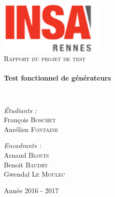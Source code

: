 \begin{titlepage}
		\begin{sffamily}
			\begin{center}

				\includegraphics[width=150pt]{images/logo_INSA.png}~\\[2.5cm]

				\textsc{\huge Rapport du projet de test}\\[2.5cm]

				\HRule \\[0.4cm]
				{ \huge \bfseries Test fonctionnel de générateurs\\[0.4cm] }

				\HRule \\[4cm]

				\begin{minipage}{0.4\textwidth}
					\begin{flushleft} \large
						\emph{Étudiants :}\\
						François \textsc{Boschet}\\
						Aurélien \textsc{Fontaine}
					\end{flushleft}
				\end{minipage}
				\begin{minipage}{0.5\textwidth}
					\begin{flushright} \large
						\emph{Encadrants :} \\
						Arnaud \textsc{Blouin}\\
                        Benoit \textsc{Baudry}\\
                        Gwendal \textsc{Le Moulec}\\
					\end{flushright}
				\end{minipage}

				\vfill

				{\large Année 2016 - 2017}

			\end{center}
		\end{sffamily}
	\end{titlepage}
